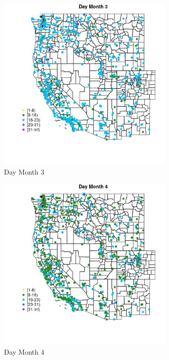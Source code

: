\begin{figure} 
\centering  
\includegraphics[width=0.77\textwidth]{Code_Outputs/Report_ML_input_PM25_Step4_part_e_de_duplicated_aveswNAs_MapObsMo3Day.jpg} 
\caption{\label{fig:Report_ML_input_PM25_Step4_part_e_de_duplicated_aveswNAsMapObsMo3Day}Day Month 3} 
\end{figure} 
 

\begin{figure} 
\centering  
\includegraphics[width=0.77\textwidth]{Code_Outputs/Report_ML_input_PM25_Step4_part_e_de_duplicated_aveswNAs_MapObsMo4Day.jpg} 
\caption{\label{fig:Report_ML_input_PM25_Step4_part_e_de_duplicated_aveswNAsMapObsMo4Day}Day Month 4} 
\end{figure} 
 

